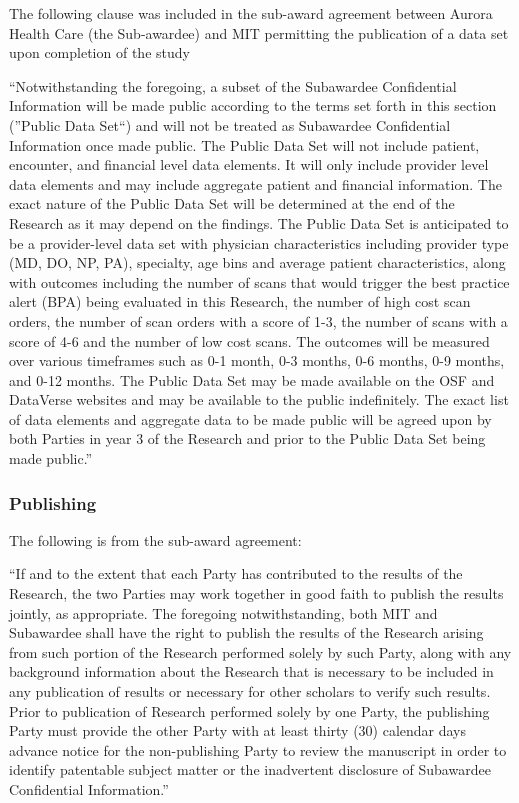 \documentclass[
]{WileySix}
\begin{document}
The following clause was included in the sub-award agreement between Aurora Health Care (the Sub-awardee) and MIT permitting the publication of a data set upon completion of the study

``Notwithstanding the foregoing, a subset of the Subawardee Confidential Information will be made public according to the terms set forth in this section (''Public Data Set``) and will not be treated as Subawardee Confidential Information once made public. The Public Data Set will not include patient, encounter, and financial level data elements. It will only include provider level data elements and may include aggregate patient and financial information. The exact nature of the Public Data Set will be determined at the end of the Research as it may depend on the findings. The Public Data Set is anticipated to be a provider-level data set with physician characteristics including provider type (MD, DO, NP, PA), specialty, age bins and average patient characteristics, along with outcomes including the number of scans that would trigger the best practice alert (BPA) being evaluated in this Research, the number of high cost scan orders, the number of scan orders with a score of 1-3, the number of scans with a score of 4-6 and the number of low cost scans. The outcomes will be measured over various timeframes such as 0-1 month, 0-3 months, 0-6 months, 0-9 months, and 0-12 months. The Public Data Set may be made available on the OSF and DataVerse websites and may be available to the public indefinitely. The exact list of data elements and aggregate data to be made public will be agreed upon by both Parties in year 3 of the Research and prior to the Public Data Set being made public.''

\hypertarget{publishing}{%
\subsubsection*{Publishing}\label{publishing}}

The following is from the sub-award agreement:

``If and to the extent that each Party has contributed to the results of the Research, the two Parties may work together in good faith to publish the results jointly, as appropriate. The foregoing notwithstanding, both MIT and Subawardee shall have the right to publish the results of the Research arising from such portion of the Research performed solely by such Party, along with any background information about the Research that is necessary to be included in any publication of results or necessary for other scholars to verify such results. Prior to publication of Research performed solely by one Party, the publishing Party must provide the other Party with at least thirty (30) calendar days advance notice for the non-publishing Party to review the manuscript in order to identify patentable subject matter or the inadvertent disclosure of Subawardee Confidential Information.''
\end{document}
